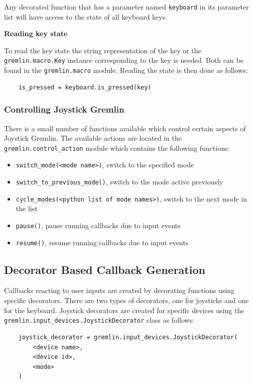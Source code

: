 \documentclass[a4, 10pt]{article}
\newcommand{\JG}{Joystick Gremlin}
\begin{document}
Any decorated function that has a parameter named \verb+keyboard+ in its
parameter list will have access to the state of all keyboard keys.

\vspace{1em}
\noindent\textbf{Reading key state}

\noindent To read the key state the string representation of the key or
the \texttt{gremlin.macro.\allowbreak Key} instance corresponding to the
key is needed. Both  can be found in the \texttt{gremlin.macro} module.
Reading the state is then done as follows:
\begin{verbatim}
    is_pressed = keyboard.is_pressed(key)
\end{verbatim}


\subsubsection{Controlling \JG{}}

There is a small number of functions available which control certain
aspects of \JG{}. The available actions are located in the
\verb+gremlin.control_action+ module which contains the following
functions:
\begin{itemize}
    \item \verb+switch_mode(<mode name>)+, switch to the specified mode
    \item \verb+switch_to_previous_mode()+, switch to the mode active
        previously
    \item \verb+cycle_modes(<python list of mode names>)+, switch to the
        next mode in the list
    \item \verb+pause()+, pause running callbacks due to input events
    \item \verb+resume()+, resume running callbacks due to input events
\end{itemize}


\subsection{Decorator Based Callback Generation}

Callbacks reacting to user inputs are created by decorating functions
using specific decorators. There are two types of decorators, one for
joysticks and one for the keyboard. Joystick decorators are created for
specific devices using the\\
\verb+gremlin.input_devices.JoystickDecorator+ class as follows:
\begin{verbatim}
    joystick_decorator = gremlin.input_devices.JoystickDecorator(
        <device name>,
        <device id>,
        <mode>
    )
\end{verbatim}
\end{document}
